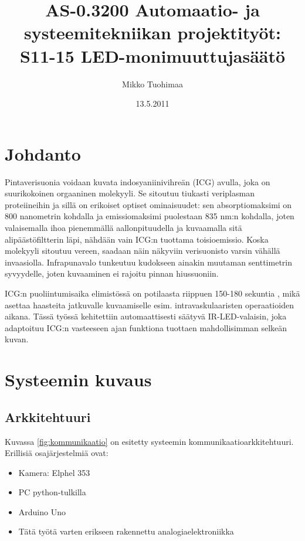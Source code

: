 \documentclass[finnish,12pt]{article}
\title{AS-0.3200 Automaatio- ja systeemitekniikan projektityöt: S11-15 LED-monimuuttujasäätö}
\author{Mikko Tuohimaa}
\date{13.5.2011}
\begin{document}
\maketitle
{}
\setcounter{page}{1}

\tableofcontents
\clearpage

\setcounter{page}{1}

\section{Johdanto}

Pintaverisuonia voidaan kuvata indosyaniinivihreän (ICG) avulla, joka on suurikokoinen orgaaninen molekyyli. Se sitoutuu tiukasti veriplasman proteiineihin ja sillä on erikoiset optiset ominaisuudet: sen absorptiomaksimi on 800 nanometrin kohdalla ja emissiomaksimi puolestaan 835 nm:n kohdalla, joten valaisemalla ihoa pienemmällä aallonpituudella ja kuvaamalla sitä alipäästöfiltterin läpi, nähdään vain ICG:n tuottama toisioemissio. Koska molekyyli sitoutuu vereen, saadaan näin näkyviin verisuonisto varsin vähällä invaasiolla. Infrapunavalo tunkeutuu kudokseen ainakin muutaman senttimetrin syvyydelle, joten kuvaaminen ei rajoitu pinnan hiussuoniin. \cite{Owens} \cite{Wikipedia}

ICG:n puoliintumisaika elimistössä on potilaasta riippuen 150-180 sekuntia \cite{Owens}, mikä asettaa haasteita jatkuvalle kuvaamiselle esim. intravaskulaaristen operaatioiden aikana. Tässä työssä kehitettiin automaattisesti säätyvä IR-LED-valaisin, joka adaptoituu ICG:n vasteeseen ajan funktiona tuottaen mahdollisimman selkeän kuvan.

\section{Systeemin kuvaus}

\subsection{Arkkitehtuuri}

Kuvassa \ref{fig:kommunikaatio} on esitetty systeemin kommunikaatio\-arkkitehtuuri. Erillisiä osajärjestelmiä ovat:

\begin{itemize}
 \item Kamera: Elphel 353
 \item PC python-tulkilla
 \item Arduino Uno
 \item Tätä työtä varten erikseen rakennettu analogiaelektroniikka
\end{itemize}
\end{document}
